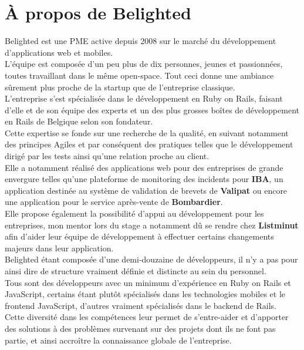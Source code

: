 \documentclass{report}
\begin{document}
\chapter{À propos de Belighted}

  Belighted est une PME active depuis 2008 sur le marché du développement d'applications web et mobiles.\\
  L'équipe est composée d'un peu plus de dix personnes, jeunes et passionnées, toutes travaillant dans le même open-space. Tout ceci donne
  une ambiance sûrement plus proche de la startup que de l'entreprise classique.\\

  L'entreprise s'est spécialisée dans le développement en Ruby on Rails, faisant d'elle et de son équipe des experts et un des plus grosses
  boîtes de développement en Rails de Belgique selon son fondateur.\\
  Cette expertise se fonde sur une recherche de la qualité, en suivant notamment des principes Agiles et par conséquent des pratiques
  telles que le développement dirigé par les tests ainsi qu'une relation proche au client.\\

  Elle a notamment réalisé des applications web pour des entreprises de grande envergure telles qu'une plateforme de monitoring des incidents pour \textbf{IBA}, un application
  destinée au système de validation de brevets de \textbf{Valipat} ou encore une application pour le service après-vente de \textbf{Bombardier}.\\
  Elle propose également la possibilité d'appui au développement pour les entreprises, mon mentor lors du stage a notamment dû se rendre chez \textbf{Listminut} afin d'aider leur équipe de développement
  à effectuer certains changements majeurs dans leur application.\\

  Belighted étant composée d'une demi-douzaine de développeurs, il n'y a pas pour ainsi dire de structure vraiment définie et distincte au sein du personnel. \\
  Tous sont des développeurs avec un minimum d'expérience en Ruby on Rails et JavaScript, certains étant plutôt spécialisés dans les technologies mobiles et le frontend JavaScript,
  d'autres vraiment spécialisés dans le backend de Rails. \\
  Cette diversité dans les compétences leur permet de s'entre-aider et d'apporter des solutions à des problèmes survenant sur des projets dont ils ne font pas partie, et ainsi
  accroître la connaissance globale de l'entreprise. \\
\end{document}
